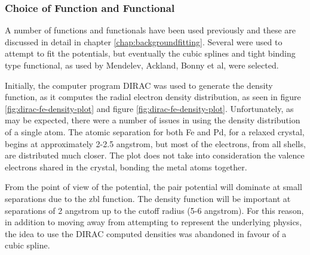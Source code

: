 \subsubsection{Choice of Function and Functional}

A number of functions and functionals have been used previously and these are discussed in detail in chapter \ref{chap:backgroundfitting}.  Several were used to attempt to fit the potentials, but eventually the cubic splines and tight binding type functional, as used by Mendelev, Ackland, Bonny et al, were selected.

Initially, the computer program DIRAC was used to generate the density function, as it computes the radial electron density distribution, as seen in figure \ref{fig:dirac-fe-density-plot} and figure \ref{fig:dirac-fe-density-plot}.  Unfortunately, as may be expected, there were a number of issues in using the density distribution of a single atom.  The atomic separation for both \Gls{Fe} and \Gls{Pd}, for a relaxed crystal, begins at approximately 2-2.5 angstrom, but most of the electrons, from all shells, are distributed much closer.  The plot does not take into consideration the valence electrons shared in the crystal, bonding the metal atoms together.

From the point of view of the potential, the pair potential will dominate at small separations due to the \acrshort{zbl} function.  The density function will be important at separations of 2 angstrom up to the cutoff radius (5-6 angstrom).  For this reason, in addition to moving away from attempting to represent the underlying physics, the idea to use the DIRAC computed densities was abandoned in favour of a cubic spline.

